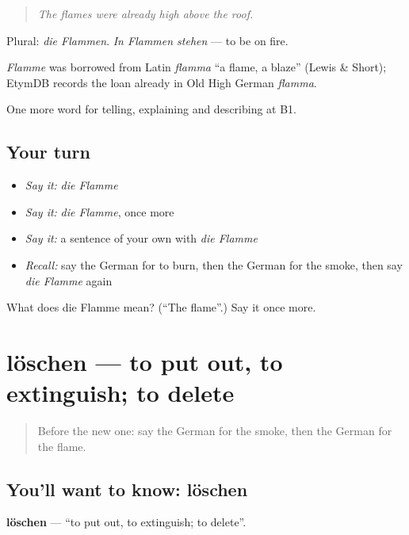 \begin{quote}
\emph{The flames were already high above the roof.}
\end{quote}

Plural: \emph{die Flammen}. \emph{In Flammen stehen} — to be on fire.

\begin{cousinweb}
\emph{Flamme} was borrowed from Latin \emph{flamma} \textquotedblleft{}a flame, a blaze\textquotedblright{} (Lewis \& Short); EtymDB records the loan already in Old High German \emph{flamma}.
\end{cousinweb}

\begin{grammarlens}[title={What you've built}]
One more word for telling, explaining and describing at B1.
\end{grammarlens}

\subsection*{Your turn}
\begin{itemize}
\raggedright
  \item \emph{Say it:} \emph{die Flamme}
  \item \emph{Say it:} \emph{die Flamme}, once more
  \item \emph{Say it:} a sentence of your own with \emph{die Flamme}
  \item \emph{Recall:} say the German for to burn, then the German for the smoke, then say \emph{die Flamme} again
\end{itemize}

\begin{tcolorbox}[breakable,colback=teal!4,colframe=teal!35!black,title={Before you move on}]
What does die Flamme mean? (\textquotedblleft{}The flame\textquotedblright{}.) Say it once more.
\end{tcolorbox}
\section[löschen]{löschen — to put out, to extinguish; to delete}

\label{lesson:GE-C293-loeschen}



\begin{quote}
Before the new one: say the German for the smoke, then the German for the flame.
\end{quote}

\subsection*{You'll want to know: löschen}
\textbf{löschen} — \textquotedblleft{}to put out, to extinguish; to delete\textquotedblright{}.


